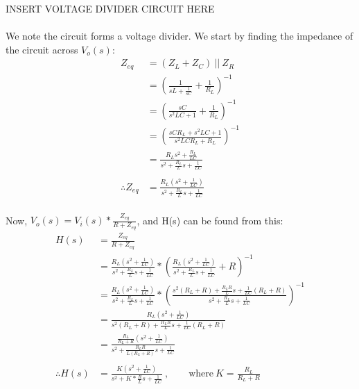 INSERT VOLTAGE DIVIDER CIRCUIT HERE
\\ \\
We note the circuit forms a voltage divider. We start by finding the impedance of the circuit across $V_o(s)$:
\begin{align*}
	Z_{eq} &= (Z_L + Z_C) \ || \ Z_R \\
	&= \left(\frac{1}{sL + \frac{1}{sC}} + \frac{1}{R_L} \right)^{-1} \\
	&= \left(\frac{sC}{s^2LC + 1} + \frac{1}{R_L} \right)^{-1} \\
	&= \left(\frac{sCR_L + s^2LC + 1}{s^2LCR_L + R_L} \right)^{-1} \\
	&= \frac{R_Ls^2 + \frac{R_L}{LC}}{s^2 + \frac{R_L}{L}s + \frac{1}{LC}} \\
	\\
	\therefore Z_{eq} &= \frac{R_L \left(s^2 + \frac{1}{LC} \right)}{s^2 + \frac{R_L}{L}s + \frac{1}{LC}}
\end{align*}
\\
Now, $V_o(s) = V_i(s)*\frac{Z_{eq}}{R+Z_{eq}}$, and H(s) can be found from this:
\begin{align*}
	H(s) &= \frac{Z_{eq}}{R+Z_{eq}} \\
	&= \frac{R_L \left(s^2 + \frac{1}{LC} \right)}{s^2 + \frac{R_L}{L}s + \frac{1}{LC}} * \left(\frac{R_L \left(s^2 + \frac{1}{LC} \right)}{s^2 + \frac{R_L}{L}s + \frac{1}{LC}} + R \right)^{-1} \\
	&= \frac{R_L \left(s^2 + \frac{1}{LC} \right)}{s^2 + \frac{R_L}{L}s + \frac{1}{LC}} * \left(\frac{s^2(R_L+R) + \frac{R_LR}{L}s + \frac{1}{LC}(R_L + R)}{s^2 + \frac{R_L}{L}s + \frac{1}{LC}} \right)^{-1} \\
	&= \frac{R_L \left(s^2 + \frac{1}{LC} \right)}{s^2(R_L+R) + \frac{R_LR}{L}s + \frac{1}{LC}(R_L + R)} \\
	&= \frac{\frac{R_L}{R_L + R} \left(s^2 + \frac{1}{LC} \right)}{s^2 + \frac{R_LR}{L(R_L + R)}s + \frac{1}{LC}} \\
	\\
	\therefore H(s) &= \frac{K \left(s^2 + \frac{1}{LC} \right)}{s^2 + K*\frac{R}{L}s + \frac{1}{LC}} \ , \qquad \mathrm{where} \  K = \frac{R_L}{R_L+R}
\end{align*}